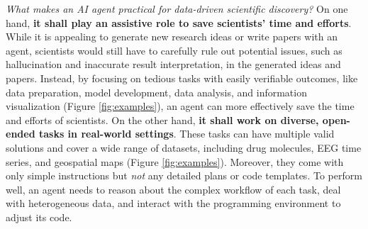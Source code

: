 %
\textit{What makes an AI agent practical for data-driven scientific discovery?}
On one hand, \textbf{it shall play an assistive role to save scientists' time and efforts}.
While it is appealing to generate new research ideas or write papers with an agent, scientists would still have to carefully rule out potential issues, such as hallucination and inaccurate result interpretation, in the generated ideas and papers.
Instead, by  focusing on tedious tasks with easily verifiable outcomes, like data preparation, model development, data analysis, and information visualization (Figure \ref{fig:examples}), an agent can more effectively save the time and efforts of scientists. 
On the other hand, \textbf{it shall work on diverse, open-ended tasks in real-world settings}.
These tasks can have multiple valid solutions and cover a wide range of datasets, including drug molecules, EEG time series, and geospatial maps (Figure \ref{fig:examples}).
Moreover, they come with only simple instructions but \textit{not} any detailed plans or code templates.
To perform well, an agent needs to reason about the complex workflow of each task, deal with heterogeneous data, and interact with the programming environment to adjust its code.
%

